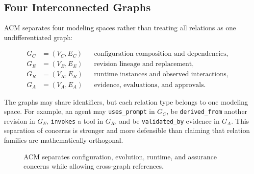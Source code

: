 \documentclass[10pt]{article}
\newcommand{\configgraph}{G_C}
\newcommand{\runtimegraph}{G_R}
\newcommand{\assurancegraph}{G_A}
\newcommand{\evolutiongraph}{G_E}
\begin{document}
\subsection{Four Interconnected Graphs}

ACM separates four modeling spaces rather than treating all relations as one undifferentiated graph:

\begin{align}
  \configgraph &= (V_C,E_C) && \text{configuration composition and dependencies},\\
  \evolutiongraph &= (V_E,E_E) && \text{revision lineage and replacement},\\
  \runtimegraph &= (V_R,E_R) && \text{runtime instances and observed interactions},\\
  \assurancegraph &= (V_A,E_A) && \text{evidence, evaluations, and approvals}.
\end{align}

The graphs may share identifiers, but each relation type belongs to one modeling space. For example, an agent may \texttt{uses\_prompt} in $\configgraph$, be \texttt{derived\_from} another revision in $\evolutiongraph$, \texttt{invokes} a tool in $\runtimegraph$, and be \texttt{validated\_by} evidence in $\assurancegraph$. This separation of concerns is stronger and more defensible than claiming that relation families are mathematically orthogonal.

\begin{figure}[t]
\centering
{}
\caption{ACM separates configuration, evolution, runtime, and assurance concerns while allowing cross-graph references.}
\label{fig:fourgraphs}
\end{figure}
\end{document}
